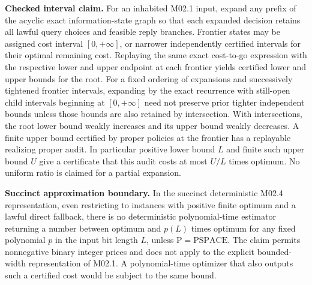 \begin{theorem}\label{ext:m025}

\textbf{Checked interval claim.} For an inhabited M02.1 input, expand any prefix of the acyclic exact information-state graph so that each expanded decision retains all lawful query choices and feasible reply branches. Frontier states may be assigned cost interval \([0,+\infty]\), or narrower independently certified intervals for their optimal remaining cost. Replaying the same exact cost-to-go expression with the respective lower and upper endpoint at each frontier yields certified lower and upper bounds for the root. For a fixed ordering of expansions and successively tightened frontier intervals, expanding by the exact recurrence with still-open child intervals beginning at \([0,+\infty]\) need not preserve prior tighter independent bounds unless those bounds are also retained by intersection. With intersections, the root lower bound weakly increases and its upper bound weakly decreases. A finite upper bound certified by proper policies at the frontier has a replayable realizing proper audit. In particular positive lower bound \(L\) and finite such upper bound \(U\) give a certificate that this audit costs at most \(U/L\) times optimum. No uniform ratio is claimed for a partial expansion.

\textbf{Succinct approximation boundary.} In the succinct deterministic M02.4 representation, even restricting to instances with positive finite optimum and a lawful direct fallback, there is no deterministic polynomial-time estimator returning a number between optimum and \(p(L)\) times optimum for any fixed polynomial \(p\) in the input bit length \(L\), unless \(\mathrm P=\mathrm{PSPACE}\). The claim permits nonnegative binary integer prices and does not apply to the explicit bounded-width representation of M02.1. A polynomial-time optimizer that also outputs such a certified cost would be subject to the same bound.

\end{theorem}

